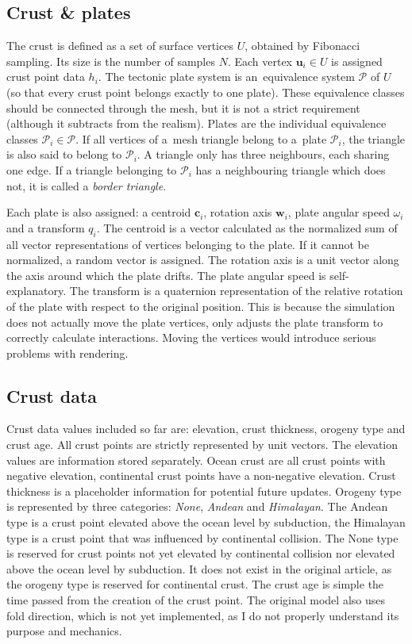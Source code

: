 \subsection{Crust \& plates}
The crust is defined as a set of surface vertices $U$, obtained by Fibonacci sampling. Its size is the number of samples $N$. Each vertex $\mathbf{u}_i\in U$ is assigned crust point data $h_i$. The tectonic plate system is an~equivalence system $\mathcal{P}$ of $U$ (so that every crust point belongs exactly to one plate). These equivalence classes should be connected through the mesh, but it is not a strict requirement (although it subtracts from the realism). Plates are the individual equivalence classes $\mathcal{P}_i\in\mathcal{P}$. If all vertices of a~mesh triangle belong to a~plate $\mathcal{P}_i$, the triangle is also said to belong to $\mathcal{P}_i$. A triangle only has three neighbours, each sharing one edge. If a triangle belonging to $\mathcal{P}_i$ has a neighbouring triangle which does not, it is called a \textit{border triangle}.

Each plate is also assigned: a centroid $\mathbf{c}_i$, rotation axis $\mathbf{w}_i$, plate angular speed $\omega_i$ and a transform $q_i$. The centroid is a vector calculated as the normalized sum of all vector representations of vertices belonging to the plate. If it cannot be normalized, a random vector is assigned. The rotation axis is a unit vector along the axis around which the plate drifts. The plate angular speed is self-explanatory. The transform is a quaternion representation of the relative rotation of the plate with respect to the original position. This is because the simulation does not actually move the plate vertices, only adjusts the plate transform to correctly calculate interactions. Moving the vertices would introduce serious problems with rendering.
\subsection{Crust data}
Crust data values included so far are: elevation, crust thickness, orogeny type and crust age. All crust points are strictly represented by unit vectors. The elevation values are information stored separately. Ocean crust are all crust points with negative elevation, continental crust points have a non-negative elevation. Crust thickness is a placeholder information for potential future updates. Orogeny type is represented by three categories: \textit{None}, \textit{Andean} and \textit{Himalayan}. The Andean type is a crust point elevated above the ocean level by subduction, the Himalayan type is a crust point that was influenced by continental collision. The None type is reserved for crust points not yet elevated by continental collision nor elevated above the ocean level by subduction. It does not exist in the original article, as the orogeny type is reserved for continental crust. The crust age is simple the time passed from the creation of the crust point. The original model also uses fold direction, which is not yet implemented, as I do not properly understand its purpose and mechanics.

